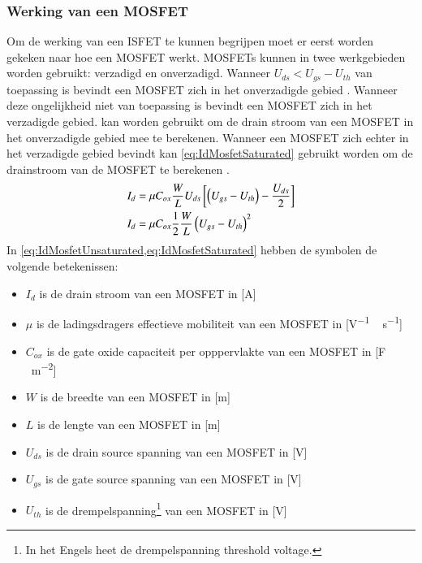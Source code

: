 \subsubsection{Werking van een MOSFET}
Om de werking van een ISFET te kunnen begrijpen moet er eerst worden gekeken naar hoe een MOSFET werkt.
MOSFETs kunnen in twee werkgebieden worden gebruikt: verzadigd en onverzadigd. Wanneer $U_{ds}<U_{gs}-U_{th}$ van toepassing is bevindt een MOSFET zich in het onverzadigde gebied \cite{bergveld1985impactOfMosfetBasedSensors,inleidingInDeElektronicaWissenburgh}. Wanneer deze ongelijkheid niet van toepassing is bevindt een MOSFET zich in het verzadigde gebied.  kan worden gebruikt om de drain stroom van een MOSFET in het onverzadigde gebied mee te berekenen. Wanneer een MOSFET zich echter in het verzadigde gebied bevindt kan \cref{eq:IdMosfetSaturated} gebruikt worden om de drainstroom van de MOSFET te berekenen \cite{elbasfun,inleidingInDeElektronicaWissenburgh,bergveld1985impactOfMosfetBasedSensors,isfetAsAnElectronicDevice,DonaldNeamenSemiconductorPhysicsAndDevicesBasicPrinciples}. %
\begin{align}
    I_d{}&={}\mu C_{ox}\frac{W}{L}U_{ds}\left[\left(U_{gs}-U_{th}\right)-\frac{U_{ds}}{2}\right]
    \tagaddtext{[\si{\ampere}]} \label{eq:IdMosfetUnsaturated}\\
    I_d{}&={}\mu C_{ox}\frac{1}{2}\frac{W}{L}\left(U_{gs}-U_{th}\right)^2
    \tagaddtext{[\si{\ampere}]} \label{eq:IdMosfetSaturated}
\end{align}
In \cref{eq:IdMosfetUnsaturated,eq:IdMosfetSaturated} hebben de symbolen de volgende betekenissen:
\begin{itemize}
    \item $I_d$ is de drain stroom van een MOSFET in [\si{\ampere}]
    \item $\mu$ is de ladingsdragers effectieve mobiliteit van een MOSFET in [\si{\volt^{-1}\,\second^{-1}}]
    \item $C_{ox}$ is de gate oxide capaciteit per opppervlakte van een MOSFET in [\si{\farad\,\meter^{-2}}]
    \item $W$ is de breedte van een MOSFET in [\si{\meter}]
    \item $L$ is de lengte van een MOSFET in [\si{\meter}]
    \item $U_{ds}$ is de drain source spanning van een MOSFET in [\si{\volt}]
    \item $U_{gs}$ is de gate source spanning van een MOSFET in [\si{\volt}]
    \item $U_{th}$ is de drempelspanning\footnote{In het Engels heet de drempelspanning threshold voltage.} van een MOSFET in [\si{\volt}]
\end{itemize}

